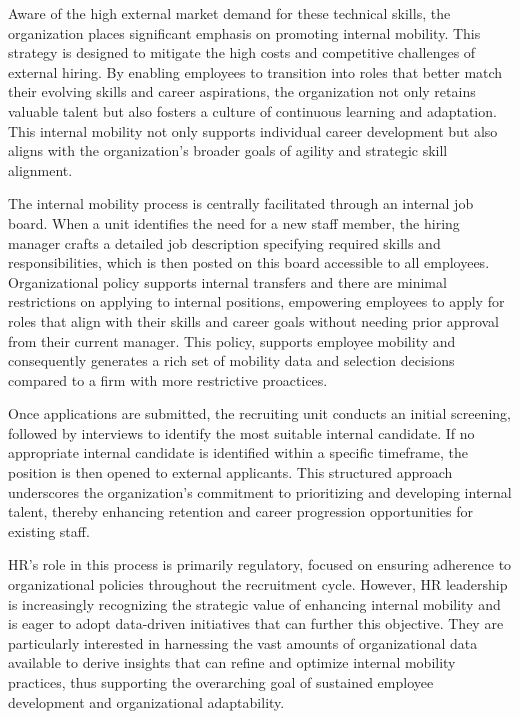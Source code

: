 Aware of the high external market demand for these technical skills, the organization places significant emphasis on 
promoting internal mobility. This strategy is designed to mitigate the high costs and competitive challenges of 
external hiring. By enabling employees to transition into roles that better match their evolving skills and 
career aspirations, the organization not only retains valuable talent but also fosters a culture of continuous 
learning and adaptation. This internal mobility not only supports individual career development but also aligns 
with the organization’s broader goals of agility and strategic skill alignment.


The internal mobility process is centrally facilitated through an internal job board. When a unit identifies the need 
for a new staff member, the hiring manager crafts a detailed job description specifying required skills and 
responsibilities, which is then posted on this board accessible to all employees. Organizational policy supports 
internal transfers and there are minimal restrictions on applying to internal positions, empowering employees 
to apply for roles that align with their skills and career goals without needing prior approval from their 
current manager. This policy, supports employee mobility and consequently generates a rich set of mobility 
data and selection decisions compared to a firm with more restrictive proactices.

Once applications are submitted, the recruiting unit conducts an initial screening, followed by interviews to 
identify the most suitable internal candidate. If no appropriate internal candidate is identified within a 
specific timeframe, the position is then opened to external applicants. This structured approach underscores 
the organization's commitment to prioritizing and developing internal talent, thereby enhancing retention and 
career progression opportunities for existing staff.

HR's role in this process is primarily regulatory, focused on ensuring adherence to organizational policies 
throughout the recruitment cycle. However, HR leadership is increasingly recognizing the strategic value of 
enhancing internal mobility and is eager to adopt data-driven initiatives that can further this objective. 
They are particularly interested in harnessing the vast amounts of organizational data available to derive 
insights that can refine and optimize internal mobility practices, thus supporting the overarching goal of 
sustained employee development and organizational adaptability.

